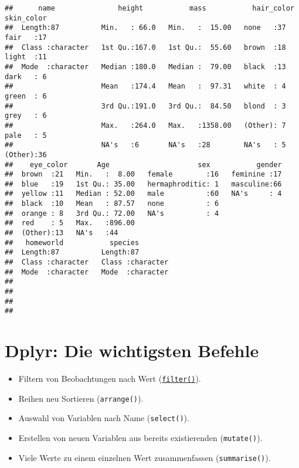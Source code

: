 \documentclass[
]{book}
\theoremstyle{definition}
\theoremstyle{definition}
\theoremstyle{definition}
\theoremstyle{definition}
\theoremstyle{remark}
\begin{document}
\begin{verbatim}
##      name               height           mass           hair_color   skin_color
##  Length:87          Min.   : 66.0   Min.   :  15.00   none   :37   fair   :17  
##  Class :character   1st Qu.:167.0   1st Qu.:  55.60   brown  :18   light  :11  
##  Mode  :character   Median :180.0   Median :  79.00   black  :13   dark   : 6  
##                     Mean   :174.4   Mean   :  97.31   white  : 4   green  : 6  
##                     3rd Qu.:191.0   3rd Qu.:  84.50   blond  : 3   grey   : 6  
##                     Max.   :264.0   Max.   :1358.00   (Other): 7   pale   : 5  
##                     NA's   :6       NA's   :28        NA's   : 5   (Other):36  
##    eye_color       Age                     sex           gender  
##  brown  :21   Min.   :  8.00   female        :16   feminine :17  
##  blue   :19   1st Qu.: 35.00   hermaphroditic: 1   masculine:66  
##  yellow :11   Median : 52.00   male          :60   NA's     : 4  
##  black  :10   Mean   : 87.57   none          : 6                 
##  orange : 8   3rd Qu.: 72.00   NA's          : 4                 
##  red    : 5   Max.   :896.00                                     
##  (Other):13   NA's   :44                                         
##   homeworld           species         
##  Length:87          Length:87         
##  Class :character   Class :character  
##  Mode  :character   Mode  :character  
##                                       
##                                       
##                                       
## 
\end{verbatim}

\hypertarget{dplyr-die-wichtigsten-befehle}{%
\section{Dplyr: Die wichtigsten Befehle}\label{dplyr-die-wichtigsten-befehle}}

\begin{itemize}
\item
  Filtern von Beobachtungen nach Wert (\href{https://rdrr.io/r/stats/filter.html}{\texttt{filter()}}).
\item
  Reihen neu Sortieren (\texttt{arrange()}).
\item
  Auswahl von Variablen nach Name (\texttt{select()}).
\item
  Erstellen von neuen Variablen aus bereits existierenden (\texttt{mutate()}).
\item
  Viele Werte zu einem einzelnen Wert zusammenfassen (\texttt{summarise()}).
\end{itemize}
\end{document}
